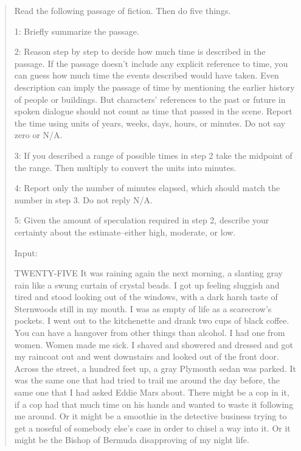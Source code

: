 \documentclass[12pt]{article}
\begin{document}
    \begin{quote}
        Read the following passage of fiction. Then do five things.

        1: Briefly summarize the passage.

        2: Reason step by step to decide how much time is described in the
        passage. If the passage doesn't include any explicit reference to time,
        you can guess how much time the events described would have taken. Even description
        can imply the passage of time by mentioning the earlier history of people
        or buildings. But characters' references to the past or future in spoken dialogue
        should not count as time that passed in the scene. Report the time using
        units of years, weeks, days, hours, or minutes. Do not say zero or N/A.

        3: If you described a range of possible times in step 2 take the
        midpoint of the range. Then multiply to convert the units into minutes.

        4: Report only the number of minutes elapsed, which should match the number
        in step 3. Do not reply N/A.

        5: Given the amount of speculation required in step 2, describe your certainty
        about the estimate--either high, moderate, or low.

        Input:

        TWENTY-FIVE It was raining again the next morning, a slanting gray rain like
        a swung curtain of crystal beads. I got up feeling sluggish and tired
        and stood looking out of the windows, with a dark harsh taste of Sternwoods
        still in my mouth. I was as empty of life as a scarecrow's pockets. I went
        out to the kitchenette and drank two cups of black coffee. You can have
        a hangover from other things than alcohol. I had one from women. Women
        made me sick. I shaved and showered and dressed and got my raincoat out and
        went downstairs and looked out of the front door. Across the street, a hundred
        feet up, a gray Plymouth sedan was parked. It was the same one that had tried
        to trail me around the day before, the same one that I had asked Eddie
        Mars about. There might be a cop in it, if a cop had that much time on
        his hands and wanted to waste it following me around. Or it might be a smoothie
        in the detective business trying to get a noseful of somebody else's case
        in order to chisel a way into it. Or it might be the Bishop of Bermuda
        disapproving of my night life.


\end{quote}
\end{document}
